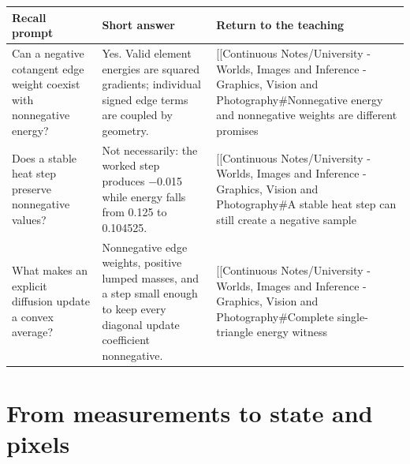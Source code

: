 {\def\LTcaptype{none} %
\begin{longtable}[]{@{}
  >{\raggedright\arraybackslash}p{}
  >{\raggedright\arraybackslash}p{}
  >{\raggedright\arraybackslash}p{}@{}}
\toprule\noalign{}
\begin{minipage}[b]{\linewidth}\raggedright
Recall prompt
\end{minipage} & \begin{minipage}[b]{\linewidth}\raggedright
Short answer
\end{minipage} & \begin{minipage}[b]{\linewidth}\raggedright
Return to the teaching
\end{minipage} \\
\midrule\noalign{}
\endhead
\bottomrule\noalign{}
\endlastfoot
Can a negative cotangent edge weight coexist with nonnegative energy? & Yes. Valid element energies are squared gradients; individual signed edge terms are coupled by geometry. & {[}{[}Continuous Notes/University - Worlds, Images and Inference - Graphics, Vision and Photography\#Nonnegative energy and nonnegative weights are different promises \\
Does a stable heat step preserve nonnegative values? & Not necessarily: the worked step produces −0.015 while energy falls from 0.125 to 0.104525. & {[}{[}Continuous Notes/University - Worlds, Images and Inference - Graphics, Vision and Photography\#A stable heat step can still create a negative sample \\
What makes an explicit diffusion update a convex average? & Nonnegative edge weights, positive lumped masses, and a step small enough to keep every diagonal update coefficient nonnegative. & {[}{[}Continuous Notes/University - Worlds, Images and Inference - Graphics, Vision and Photography\#Complete single-triangle energy witness \\
\end{longtable}
}

\section{From measurements to state and pixels}\label{appendix-a8f634b076b5-from-measurements-to-state-and-pixels}

